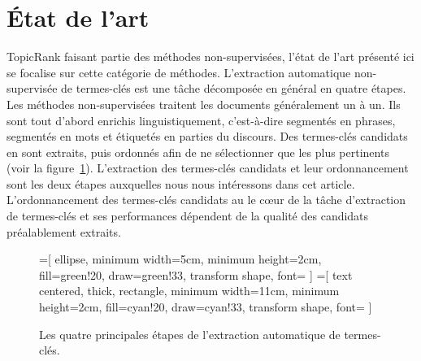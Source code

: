 \section{État de l'art}
\label{sec:etat_de_l_art}
  TopicRank faisant partie des méthodes non-supervisées, l'état de l'art
  présenté ici se focalise sur cette catégorie de méthodes.
  L'extraction automatique non-supervisée de termes-clés est une tâche
  décomposée en général en quatre étapes. Les méthodes non-supervisées traitent
  les documents généralement un à un. Ils sont tout d'abord enrichis
  linguistiquement, c'est-à-dire segmentés en phrases, segmentés en mots 
  et étiquetés en parties du discours. Des termes-clés candidats en sont
  extraits, puis ordonnés afin de ne sélectionner que les plus pertinents (voir
  la figure~\ref{fig:etapes_de_l_extraction_de_termes_cles}). L'extraction des
  termes-clés candidats et leur ordonnancement sont les deux étapes auxquelles
  nous nous intéressons dans cet article. L'ordonnancement des termes-clés
  candidats au le c\oe{}ur de la tâche d'extraction de termes-clés et ses
  performances dépendent de la qualité des candidats préalablement extraits.
  \begin{figure}
    =[
      ellipse,
      minimum width=5cm,
      minimum height=2cm,
      fill=green!20,
      draw=green!33,
      transform shape,
      font={\huge}
    ]
    =[
      text centered,
      thick,
      rectangle,
      minimum width=11cm,
      minimum height=2cm,
      fill=cyan!20,
      draw=cyan!33,
      transform shape,
      font={\huge\bfseries}
    ]

    \centering
    \caption{Les quatre principales étapes de l'extraction automatique de
             termes-clés. \label{fig:etapes_de_l_extraction_de_termes_cles}}
  \end{figure}

